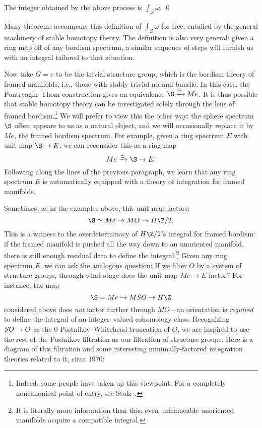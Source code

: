 \begin{lemma}%
The integer obtained by the above process is \(\int_Z \omega\). \qed
\end{lemma}

\noindent Many theorems accompany this definition of \(\int_Z \omega\) for free, entailed by the general machinery of stable homotopy theory.  The definition is also very general: given a ring map off of any bordism spectrum, a similar sequence of steps will furnish us with an integral tailored to that situation.

Now take \(G = e\) to be the trivial structure group, which is the bordism theory of framed manifolds, i.e., those with stably trivial normal bundle.  In this case, the Pontryagin--Thom construction gives an equivalence \(\S \xrightarrow{\simeq} Me\).  It is thus possible that stable homotopy theory can be investigated solely through the lens of framed bordism.\footnote{Indeed, some people have taken up this viewpoint.  For a completely noncanonical point of entry, see Stolz~\cite{Stolz}.}  We will prefer to view this the other way: the sphere spectrum \(\S\) often appears to us as a natural object, and we will occasionally replace it by \(Me\), the framed bordism spectrum.  For example, given a ring spectrum \(E\) with unit map \(\S \to E\), we can reconsider this as a ring map \[Me \xrightarrow{\simeq} \S \to E.\]  Following along the lines of the previous paragraph, we learn that any ring spectrum \(E\) is automatically equipped with a theory of integration for framed manifolds.

Sometimes, as in the examples above, this unit map factors: \[\S \simeq Me \to MO \to H\Z/2.\]  This is a witness to the overdeterminacy of \(H\Z/2\)'s integral for framed bordism: if the framed manifold is pushed all the way down to an unoriented manifold, there is still enough residual data to define the integral.\footnote{It is literally more information than this: even unframeable unoriented manifolds acquire a compatible integral.}  Given any ring spectrum \(E\), we can ask the analogous question: If we filter \(O\) by a system of structure groups, through what stage does the unit map \(Me \to E\) factor?  For instance, the map \[\S = Me \to M\SO \to H\Z\] considered above does \emph{not} factor further through \(MO\)---an orientation is \emph{required} to define the integral of an integer--valued cohomology class.  Recognizing \(\mathit{SO} \to O\) as the \(0\){\th} Postnikov--Whitehead truncation of \(O\), we are inspired to use the rest of the Postnikov filtration as our filtration of structure groups.  Here is a diagram of this filtration and some interesting minimally-factored integration theories related to it, circa 1970:
\begin{center}
\end{center}


